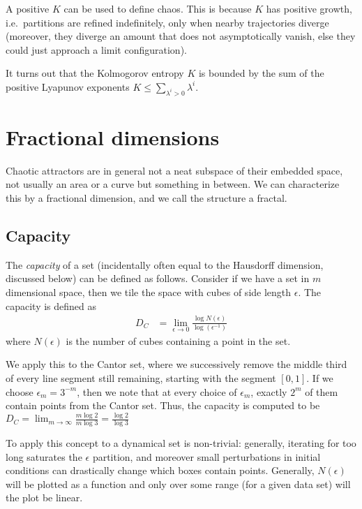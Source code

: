 \documentclass[10pt]{article}
\begin{document}
A positive $K$ can be used to define chaos. This is because $K$ has positive
growth, i.e.\ partitions are refined indefinitely, only when nearby trajectories
diverge (moreover, they diverge an amount that does not asymptotically vanish,
else they could just approach a limit configuration).

It turns out that the Kolmogorov entropy $K$ is bounded by the sum of the
positive Lyapunov exponents $K \leq \sum\limits_{\lambda^i > 0}^{}\lambda^i$.

\clearpage

\section{Fractional dimensions}

Chaotic attractors are in general not a neat subspace of their embedded space,
not usually an area or a curve but something in between. We can characterize
this by a fractional dimension, and we call the structure a fractal.

\subsection{Capacity}

The \emph{capacity} of a set (incidentally often equal to the Hausdorff
dimension, discussed below) can be defined as follows. Consider if we have a set
in $m$ dimensional space, then we tile the space with cubes of side length
$\epsilon$. The capacity is defined as
\begin{align}
    D_C &= \lim_{\epsilon \to 0}\frac{\log N(\epsilon)}{\log(\epsilon^{-1})}
\end{align}
where $N(\epsilon)$ is the number of cubes containing a point in the set.

We apply this to the Cantor set, where we successively remove the middle third
of every line segment still remaining, starting with the segment $[0,1]$. If we
choose $\epsilon_m = 3^{-m}$, then we note that at every choice of $\epsilon_m$,
exactly $2^m$ of them contain points from the Cantor set. Thus, the capacity is
computed to be
$D_C = \lim_{m \to \infty}\frac{m\log 2}{m \log 3} = \frac{\log 2}{\log 3}$

To apply this concept to a dynamical set is non-trivial: generally, iterating
for too long saturates the $\epsilon$ partition, and moreover small
perturbations in initial conditions can drastically change which boxes contain
points. Generally, $N(\epsilon)$ will be plotted as a function and only over
some range (for a given data set) will the plot be linear.
\end{document}
